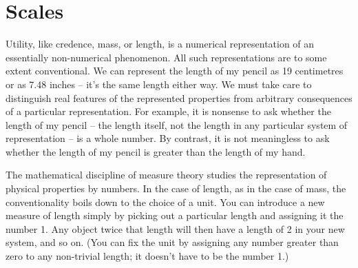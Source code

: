 


\section{Scales}

Utility, like credence, mass, or length, is a numerical representation
of an essentially non-numerical phenomenon. All such representations
are to some extent conventional.  We can represent the length of my
pencil as 19 centimetres or as 7.48 inches -- it's the same length
either way. We must take care to distinguish real features of the
represented properties from arbitrary consequences of a particular
representation. For example, it is nonsense to ask whether the length
of my pencil -- the length itself, not the length in any particular
system of representation -- is a whole number. By contrast, it is not
meaningless to ask whether the length of my pencil is greater than the
length of my hand.

The mathematical discipline of measure theory studies the
representation of physical properties by numbers. In the case of
length, as in the case of mass, the conventionality boils down to the
choice of a unit. You can introduce a new measure of length simply by
picking out a particular length and assigning it the number 1. Any
object twice that length will then have a length of 2 in your new
system, and so on. (You can fix the unit by assigning any number
greater than zero to any non-trivial length; it doesn't have to be the
number 1.)

